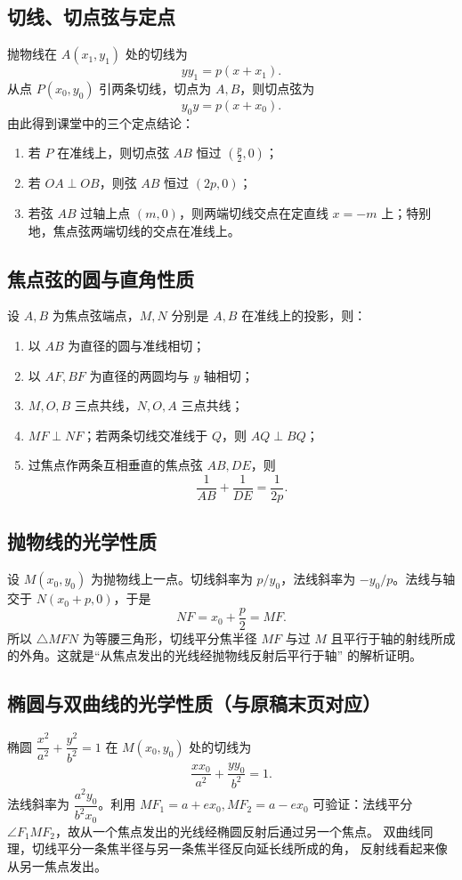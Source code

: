\documentclass[UTF8]{ctexart}
\begin{document}
	\subsection{切线、切点弦与定点}
	抛物线在 $A(x_1,y_1)$ 处的切线为
	\[
	 \boxed{yy_1=p(x+x_1)}.
	\]
	从点 $P(x_0,y_0)$ 引两条切线，切点为 $A,B$，则切点弦为
	\[
	 \boxed{y_0y=p(x+x_0)}.
	\]
	由此得到课堂中的三个定点结论：
	\begin{enumerate}
	 \item 若 $P$ 在准线上，则切点弦 $AB$ 恒过 $(\tfrac p2,0)$；
	 \item 若 $OA\perp OB$，则弦 $AB$ 恒过 $(2p,0)$；
	 \item 若弦 $AB$ 过轴上点 $(m,0)$，则两端切线交点在定直线
	 $x=-m$ 上；特别地，焦点弦两端切线的交点在准线上。
	\end{enumerate}

	\subsection{焦点弦的圆与直角性质}
	设 $A,B$ 为焦点弦端点，$M,N$ 分别是 $A,B$ 在准线上的投影，则：
	\begin{enumerate}
	 \item 以 $AB$ 为直径的圆与准线相切；
	 \item 以 $AF,BF$ 为直径的两圆均与 $y$ 轴相切；
	 \item $M,O,B$ 三点共线，$N,O,A$ 三点共线；
	 \item $MF\perp NF$；若两条切线交准线于 $Q$，则 $AQ\perp BQ$；
	 \item 过焦点作两条互相垂直的焦点弦 $AB,DE$，则
	 \[
	 \boxed{\frac1{AB}+\frac1{DE}=\frac1{2p}}.
	 \]
	\end{enumerate}

	\subsection{抛物线的光学性质}
	设 $M(x_0,y_0)$ 为抛物线上一点。切线斜率为 $p/y_0$，法线斜率为
	$-y_0/p$。法线与轴交于 $N(x_0+p,0)$，于是
	\[
	 NF=x_0+\frac p2=MF.
	\]
	所以 $\triangle MFN$ 为等腰三角形，切线平分焦半径 $MF$ 与过 $M$
	且平行于轴的射线所成的外角。这就是“从焦点发出的光线经抛物线反射后平行于轴”
	的解析证明。

	\subsection{椭圆与双曲线的光学性质（与原稿末页对应）}
	椭圆 $\dfrac{x^2}{a^2}+\dfrac{y^2}{b^2}=1$ 在
	$M(x_0,y_0)$ 处的切线为
	\[
	 \frac{xx_0}{a^2}+\frac{yy_0}{b^2}=1.
	\]
	法线斜率为 $\dfrac{a^2y_0}{b^2x_0}$。利用
	$MF_1=a+ex_0,MF_2=a-ex_0$ 可验证：法线平分
	$\angle F_1MF_2$，故从一个焦点发出的光线经椭圆反射后通过另一个焦点。
	双曲线同理，切线平分一条焦半径与另一条焦半径反向延长线所成的角，
	反射线看起来像从另一焦点发出。
\end{document}
